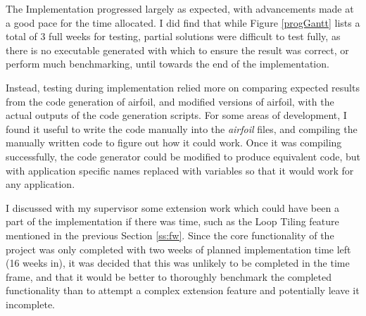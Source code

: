 The Implementation progressed largely as expected, with advancements made at a good pace for the time allocated. I did find that while Figure \ref{progGantt} lists a total of 3 full weeks for testing, partial solutions were difficult to test fully, as there is no executable generated with which to ensure the result was correct, or perform much benchmarking, until towards the end of the implementation.
\par
Instead, testing during implementation relied more on comparing expected results from the code generation of airfoil, and modified versions of airfoil, with the actual outputs of the code generation scripts. For some areas of development, I found it useful to write the code manually into the \textit{airfoil} files, and compiling the manually written code to figure out how it could work. Once it was compiling successfully, the code generator could be modified to produce equivalent code, but with application specific names replaced with variables so that it would work for any application.
\par
I discussed with my supervisor some extension work which could have been a part of the implementation if there was time, such as the Loop Tiling feature mentioned in the previous Section \ref{ss:fw}. Since the core functionality of the project was only completed with two weeks of planned implementation time left (16 weeks in), it was decided that this was unlikely to be completed in the time frame, and that it would be better to thoroughly benchmark the completed functionality than to attempt a complex extension feature and potentially leave it incomplete.

